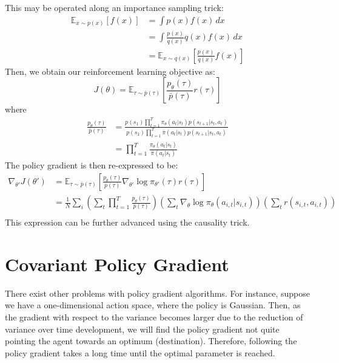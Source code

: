 This may be operated along an importance sampling trick:
\begin{align*}
    \mathbb{E}_{x \sim p(x)} [f(x)]
    &= \int p(x) f(x) \,dx \\
    &= \int \frac{p(x)}{q(x)} q(x) f(x) \,dx \\
    &= \mathbb{E}_{x \sim q(x)} \left[ \frac{p(x)}{q(x)} f(x) \right]
\end{align*}
Then, we obtain our reinforcement learning objective as:
\[
    J(\theta) = \mathbb{E}_{\tau \sim \bar{p}(\tau)} \left[ \frac{p_\theta (\tau)}{\bar{p}(\tau)} r(\tau) \right]
\]
where
\begin{align*}
    \frac{p_\theta (\tau)}{\bar{p}(\tau)}
    &= \frac{p(s_1) \prod_{t=1}^T \pi_\theta (a_t | s_t) p(s_{t+1} | s_t, a_t)}{p(s_1) \prod_{t=1}^T \bar{\pi} (a_t | s_t) p(s_{t+1} | s_t, a_t)} \\
    &= \prod_{t=1}^T \frac{\pi_\theta (a_t | s_t)}{\bar{\pi} (a_t | s_t)}
\end{align*}
The policy gradient is then re-expressed to be:
\begin{align*}
    \nabla_{\theta'} J(\theta') &= \mathbb{E}_{\tau \sim \bar{p}(\tau)} \left[ \frac{p_\theta (\tau)}{\bar{p}(\tau)} \nabla_{\theta'} \log \pi_{\theta'}(\tau) r(\tau) \right] \\
    &= \frac{1}{N} \sum_i (\sum_t \prod_{t=1}^T \frac{p_\theta (\tau)}{\bar{p}(\tau)}) (\sum_t \nabla_\theta \log \pi_\theta(a_{i,t} | s_{i,t})) (\sum_t r(s_{i,t}, a_{i,t})) \\
\end{align*}
This expression can be further advanced using the causality trick.

\section{Covariant Policy Gradient}
There exist other problems with policy gradient algorithms.
For instance, suppose we have a one-dimensional action space, where the policy is Gaussian.
Then, as the gradient with respect to the variance becomes larger due to the reduction of variance over time development, we will find the policy gradient not quite pointing the agent towards an optimum (destination).
Therefore, following the policy gradient takes a long time until the optimal parameter is reached.

